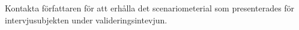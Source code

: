 Kontakta författaren för att erhålla det scenariometerial som presenterades för intervjusubjekten under valideringsintevjun. 